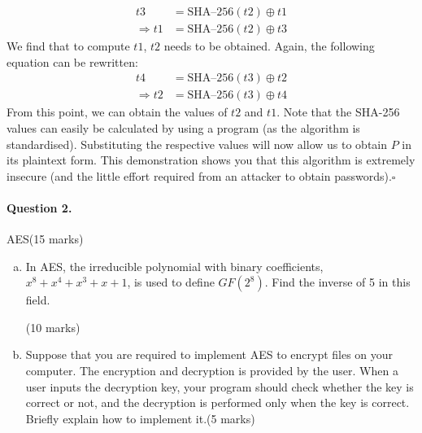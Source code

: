 \documentclass[12pt]{article}
\begin{document}
\begin{enumerate}[(a)]
\begin{equation*}
\begin{split}
t3&=\text{SHA--256}(t2)\oplus t1\\
\Rightarrow t1&=\text{SHA--256}(t2)\oplus t3
\end{split}
\end{equation*}
We find that to compute $t1$, $t2$ needs to be obtained. Again, the following equation can be rewritten:
\begin{equation*}
\begin{split}
t4&=\text{SHA--256}(t3)\oplus t2\\
\Rightarrow t2&=\text{SHA--256}(t3)\oplus t4
\end{split}
\end{equation*}
From this point, we can obtain the values of $t2$ and $t1$. Note that the SHA-256 values can easily be calculated by using a program (as the algorithm is standardised). Substituting the respective values will now allow us to obtain $P$ in its plaintext form. This demonstration shows you that this algorithm is extremely insecure (and the little effort required from an attacker to obtain passwords).\hfill $\square$
\end{enumerate}
\paragraph{Question 2.}   AES\hfill (15 marks)
\begin{enumerate}[(a)]
\item In AES, the irreducible polynomial with binary coefficients, $x^8+x^4+x^3+x+1$, is used to define $GF(2^8)$. Find the inverse of 5 in this field.{\vspace{-1em}\begin{flushright} (10 marks)\end{flushright}}
\item Suppose that you are required to implement AES to encrypt files on your computer. The encryption and decryption is provided by the user. When a user inputs the decryption key, your program should check whether the key is correct or not, and the decryption is performed only when the key is correct. Briefly explain how to implement it.\hfill (5 marks)
\end{enumerate}
\end{document}
